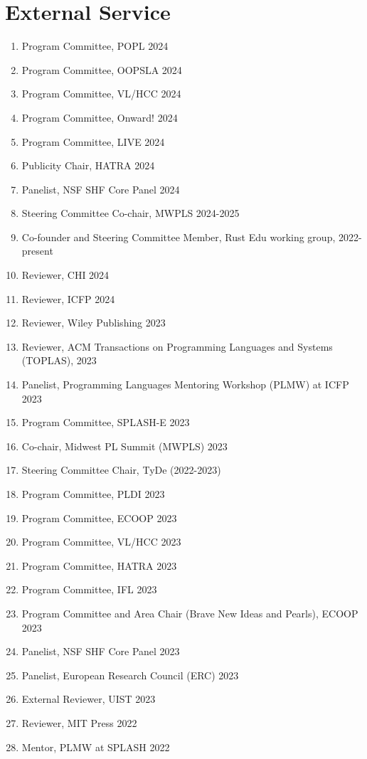 \documentclass[10pt,letterpaper]{article}
\begin{document}
\section*{External Service}
\begin{enumerate}
  \item Program Committee, POPL 2024
  \item Program Committee, OOPSLA 2024
  \item Program Committee, VL/HCC 2024
  \item Program Committee, Onward! 2024
  \item Program Committee, LIVE 2024
  \item Publicity Chair, HATRA 2024
  \item Panelist, NSF SHF Core Panel 2024
  \item Steering Committee Co-chair, MWPLS 2024-2025
  \item Co-founder and Steering Committee Member, Rust Edu working group, 2022-present
  \item Reviewer, CHI 2024
  \item Reviewer, ICFP 2024
  \item Reviewer, Wiley Publishing 2023
  \item Reviewer, ACM Transactions on Programming Languages and Systems (TOPLAS), 2023
  \item Panelist, Programming Languages Mentoring Workshop (PLMW) at ICFP 2023
  \item Program Committee, SPLASH-E 2023
  \item Co-chair, Midwest PL Summit (MWPLS) 2023
  \item Steering Committee Chair, TyDe (2022-2023)
  \item Program Committee, PLDI 2023
  \item Program Committee, ECOOP 2023
  \item Program Committee, VL/HCC 2023
  \item Program Committee, HATRA 2023
  \item Program Committee, IFL 2023
  \item Program Committee and Area Chair (Brave New Ideas and Pearls), ECOOP 2023
  \item Panelist, NSF SHF Core Panel 2023
  \item Panelist, European Research Council (ERC) 2023
  \item External Reviewer, UIST 2023
  \item Reviewer, MIT Press 2022
  \item Mentor, PLMW at SPLASH 2022

\end{enumerate}
\end{document}
